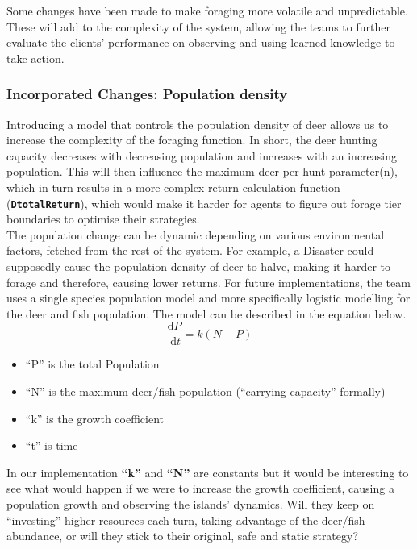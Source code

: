 Some changes have been made to make foraging more volatile and unpredictable. These will add to the complexity of the system, allowing the teams to further evaluate the clients’ performance on observing and using learned knowledge to take action.

\subsubsection{Incorporated Changes: Population density}

Introducing a model that controls the population density of deer allows us to increase the complexity of the foraging function. In short, the deer hunting capacity decreases with decreasing population and increases with an increasing population. This will then influence the maximum deer per hunt parameter(n), which in turn results in a more complex return calculation function (\texttt{\textbf{DtotalReturn}}), which would make it harder for agents to figure out forage tier boundaries to optimise their strategies.\\

The population change can be dynamic depending on various environmental factors, fetched from the rest of the system. For example, a Disaster could supposedly cause the population density of deer to halve, making it harder to forage and therefore, causing lower returns. For future implementations, the team uses a single species population model and more specifically logistic modelling for the deer and fish population. The model can be described in the equation below.\\

\begin{equation}
\frac{\mathrm{d} P}{\mathrm{~d} t}=k(N-P)
\end{equation}

\begin{itemize}
        \item “P” is the total Population \item “N” is the maximum deer/fish population (“carrying capacity” formally)
        \item “k” is the growth coefficient
        \item “t” is time
    \end{itemize}

In our implementation \textbf{“k”} and \textbf{“N”} are constants but it would be interesting to see what would happen if we were to increase the growth coefficient, causing a population growth and observing the islands’ dynamics. Will they keep on “investing” higher resources each turn, taking advantage of the deer/fish abundance, or will they stick to their original, safe and static strategy?\\

